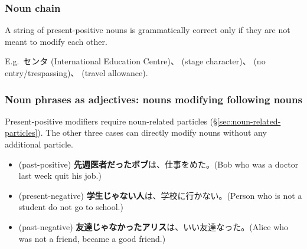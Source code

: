 \documentclass[../nihongo-gakushuu-kyouzai.tex]{subfiles}
\begin{document}
\subsubsection{Noun chain}
A string of present-positive nouns is grammatically correct only if they are not meant to modify each other.

E.g.\ センタ (International Education Centre)、 (stage character)、 (no entry/trespassing)、 (travel allowance).

\subsubsection{Noun phrases as adjectives: nouns modifying following nouns}
Present-positive modifiers require noun-related particles (\S\ref{sec:noun-related-particles}). The other three cases can directly modify nouns without any additional particle.
\begin{itemize}
    \item (past-positive) \textbf{先週医者だったボブ}は、仕事をめた。(Bob who was a doctor last week quit his job.)
    \item (present-negative) \textbf{学生じゃない人}は、学校に行かない。(Person who is not a student do not go to school.)
    \item (past-negative) \textbf{友達じゃなかったアリス}は、いい友達なった。(Alice who was not a friend, became a good friend.)
\end{itemize}
\end{document}
